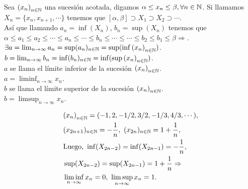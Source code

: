 \begin{definition}
  Sea \({(x_n)}_{n \in \mathbb{N}} \) una sucesión acotada, digamos \(\alpha \leq x_n \leq \beta, \forall n \in \mathbb{N} \).
  Si llamamos \(X_n = \{ x_n, x_{n+1}, \cdots \} \) tenemos que \([\alpha, \beta] \supset X_1 \supset X_2 \supset \cdots \). \\
  Así que llamando \(a_n = \inf(X_n)\), \(b_n = \sup(X_n)\) tenemos que \\
  \(\alpha \leq a_1 \leq a_2 \leq \cdots \leq a_n \leq \cdots \leq b_n \leq \cdots \leq \cdots \leq b_2 \leq b_1 \leq \beta \Rightarrow \). \\
  \(\exists a = \lim_{n \to \infty} a_n = \sup(a_n)_{n \in \mathbb{N}} = \sup(\inf{(x_n)}_{n \in \mathbb{N}})\). \\
  \(b = \lim_{n \to \infty} b_n = \inf(b_n)_{n \in \mathbb{N}} = \inf(\sup{(x_n)}_{n \in \mathbb{N}})\). \\

  \(a\) se llama el límite inferior de la sucesión \({(x_n)}_{n \in \mathbb{N}} \). \\
  \(a = \liminf_{n \to \infty} x_n\). \\

  \(b\) se llama el límite superior de la sucesión \({(x_n)}_{n \in \mathbb{N}} \). \\
  \(b = \limsup_{n \to \infty} x_n\).
\end{definition}

\clearpage

\begin{eg}
  \begin{align*}
     & {(x_n)}_{n \in \mathbb{N}} = (-1, 2, -1/2, 3/2, -1/3, 4/3, \cdots),                      \\
     & (x_{2n+1})_{n \in \mathbb{N}} = -\frac{1}{n}, \ (x_{2n})_{n \in \mathbb{N}} = 1 + \frac{1}{n}, \\
     & \text{Luego, } \inf(X_{2n-2}) = \inf(X_{2n-1}) = -\frac{1}{n},                 \\
     & \sup(X_{2n-2}) = \sup(X_{2n-1}) = 1 + \frac{1}{n} \Rightarrow                  \\
     & \liminf_{n \to \infty} x_n = 0, \ \limsup_{n \to \infty} x_n = 1.
  \end{align*}
\end{eg}